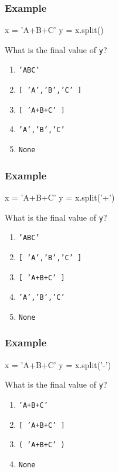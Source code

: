 \documentclass[11pt]{beamer}
\begin{document}
\begin{frame}[fragile]
  \frametitle{Example}
  \Enlarge

  \begin{semiverbatim}
x = 'A+B+C'
y = x.split()
  \end{semiverbatim}
  What is the final value of \texttt{y}?
  \begin{enumerate}[label=\Alph*]
  \item  \texttt{'ABC'}
  \item  \texttt{[ 'A','B','C' ]}
  \item  \texttt{[ 'A+B+C' ]} %
  \item  \texttt{'A','B','C'}
  \item  \texttt{None}
  \end{enumerate}
\end{frame}

\begin{frame}[fragile]
  \frametitle{Example}
  \Enlarge

  \begin{semiverbatim}
x = 'A+B+C'
y = x.split('+')
  \end{semiverbatim}
  What is the final value of \texttt{y}?
  \begin{enumerate}[label=\Alph*]
  \item  \texttt{'ABC'}
  \item  \texttt{[ 'A','B','C' ]} %
  \item  \texttt{[ 'A+B+C' ]}
  \item  \texttt{'A','B','C'}
  \item  \texttt{None}
  \end{enumerate}
\end{frame}

\begin{frame}[fragile]
  \frametitle{Example}
  \Enlarge

  \begin{semiverbatim}
x = 'A+B+C'
y = x.split('-')
  \end{semiverbatim}
  What is the final value of \texttt{y}?
  \begin{enumerate}[label=\Alph*]
  \item  \texttt{'A+B+C'}
  \item  \texttt{[ 'A+B+C' ]} %
  \item  \texttt{( 'A+B+C' )}
  \item  \texttt{None}
  \end{enumerate}
\end{frame}
\end{document}
